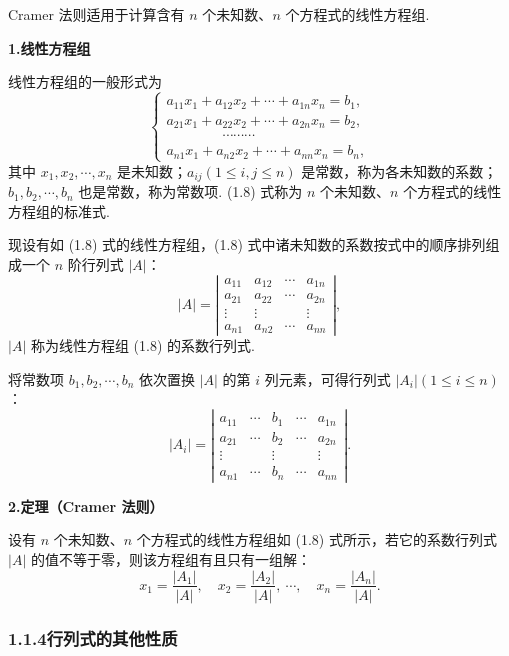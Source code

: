 \documentclass[UTF8, 12pt, fontset=fandol, oneside]{ctexart}
\begin{document}
Cramer 法则适用于计算含有 $n$ 个未知数、$n$ 个方程式的线性方程组.

\noindent\textbf{1.\quad 线性方程组}

线性方程组的一般形式为
\begin{equation}
\left\{
\begin{array}{l}
a_{11}x_1+a_{12}x_2+\cdots+a_{1n}x_n=b_1,\\
a_{21}x_1+a_{22}x_2+\cdots+a_{2n}x_n=b_2,\\
\hspace{4em}\cdots\cdots\cdots\\
a_{n1}x_1+a_{n2}x_2+\cdots+a_{nn}x_n=b_n,
\end{array}
\right.
\tag{1.8}
\end{equation}
其中 $x_1,x_2,\cdots,x_n$ 是未知数；$a_{ij}(1\le i,j\le n)$ 是常数，称为各未知数的系数；$b_1,b_2,\cdots,b_n$ 也是常数，称为常数项. (1.8) 式称为 $n$ 个未知数、$n$ 个方程式的线性方程组的标准式.

现设有如 (1.8) 式的线性方程组，(1.8) 式中诸未知数的系数按式中的顺序排列组成一个 $n$ 阶行列式 $|A|$：
\[
|A|=
\left|\begin{array}{cccc}
a_{11} & a_{12} & \cdots & a_{1n}\\
a_{21} & a_{22} & \cdots & a_{2n}\\
\vdots & \vdots &        & \vdots\\
a_{n1} & a_{n2} & \cdots & a_{nn}
\end{array}\right|,
\]
$|A|$ 称为线性方程组 (1.8) 的系数行列式.

将常数项 $b_1,b_2,\cdots,b_n$ 依次置换 $|A|$ 的第 $i$ 列元素，可得行列式 $|A_i|(1\le i\le n)$：
\[
|A_i|=
\left|\begin{array}{ccccc}
a_{11} & \cdots & b_1 & \cdots & a_{1n}\\
a_{21} & \cdots & b_2 & \cdots & a_{2n}\\
\vdots &        & \vdots &        & \vdots\\
a_{n1} & \cdots & b_n & \cdots & a_{nn}
\end{array}\right|.
\]

\noindent\textbf{2.\quad 定理（Cramer 法则）}

设有 $n$ 个未知数、$n$ 个方程式的线性方程组如 (1.8) 式所示，若它的系数行列式 $|A|$ 的值不等于零，则该方程组有且只有一组解：
\[
x_1=\frac{|A_1|}{|A|},\quad x_2=\frac{|A_2|}{|A|},\ \cdots,\quad
x_n=\frac{|A_n|}{|A|}.
\]

\subsubsection*{1.1.4\quad 行列式的其他性质}
\end{document}

